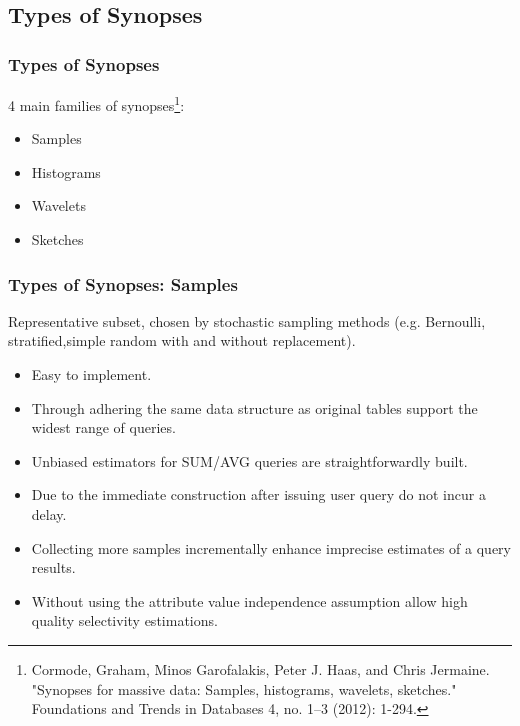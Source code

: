 \documentclass{beamer}
\begin{document}
\subsection{Types of Synopses}
\begin{frame}
\frametitle{Types of Synopses}
4 main families of synopses\footnote{\tiny Cormode, Graham, Minos Garofalakis, Peter J. Haas, and Chris Jermaine. "Synopses for massive data:
Samples, histograms, wavelets, sketches." Foundations and Trends in Databases 4, no. 1–3 (2012): 1-294.}:
\begin{itemize}
\vspace{0.3 cm}
\item{Samples}
\item{Histograms}
\item{Wavelets}
\item{Sketches}
\end{itemize}
\end{frame}

\begin{frame}
\frametitle{Types of Synopses: Samples}
Representative subset, chosen by stochastic sampling methods (e.g. Bernoulli, stratified,simple random with and without replacement).\pause
\vspace{0.2 cm}
\begin{itemize}
\item{Easy to implement.}
\item{Through adhering the same data structure as original tables support the widest range of queries.}
\item{Unbiased estimators for SUM/AVG queries are straightforwardly built.}
\item{Due to the immediate construction after issuing user query do not incur a delay.}
\item{Collecting more samples incrementally enhance imprecise estimates of a query results.}
\item{Without using the attribute value independence assumption allow high quality selectivity estimations.}
\end{itemize}
\end{frame}
\end{document}
